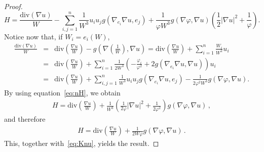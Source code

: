 \documentclass[10pt,a4paper]{amsart}
\begin{document}
\begin{proof}
\begin{equation}
H=\frac{\mathrm{div}(\nabla u)}{W} -\sum^{n}_{i,j=1}\frac{1}{W^3}u_iu_jg(\nabla_{e_i}\nabla u,e_j)+\frac{1}{\varphi W^3}g(\nabla \varphi,\nabla u)\left(\frac{1}{2}|\nabla u|^2+\frac{1}{\varphi}\right).
\end{equation}
Notice now that, if $W_i = e_i (W)$,
\begin{eqnarray*}
\frac{\mathrm{div}(\nabla u)}{W}&=&
\mathrm{div}\left(\frac{\nabla u}{W}\right) -g\left(\nabla\left(\frac{1}{W}\right),\nabla u\right) =\mathrm{div}\left(\frac{\nabla u}{W}\right)+\sum_{i=1}^n\frac{W_i}{W^2}u_i\\
&=&\mathrm{div}\left(\frac{\nabla u}{W}\right)
+\sum_{i=1}^n  \frac{1}{2W^3}\left( -\frac{\varphi_i}{\varphi^2}+2g(\nabla_{e_i}\nabla u,\nabla u)\right)u_i\\
&=&\mathrm{div}\left(\frac{\nabla u}{W}\right) +\sum_{i,j=1}^n\frac{1}{W^3}u_iu_jg(\nabla_{e_i}\nabla u,e_j)-\frac{1}{2\varphi^2W^3}g(\nabla \varphi,\nabla u).
\end{eqnarray*}
By using equation~\eqref{eq:nH}, we obtain
\begin{eqnarray*}
H=\mathrm{div}\left(\frac{\nabla u}{W}\right)+\frac{1}{W^3}\left(\frac{1}{2\varphi}|\nabla u|^2+\frac{1}{2\varphi^2}\right)g(\nabla \varphi,\nabla u) \, ,
\end{eqnarray*}
and therefore
\begin{eqnarray}\label{H_Killinggraph}
H=\mathrm{div}\left(\frac{\nabla u}{W}\right)+\frac{1}{2W\varphi}g(\nabla \varphi,\nabla u) \, .
\end{eqnarray}
This, together with~\eqref{eq:Knu}, yields the result.
\end{proof}
\end{document}
